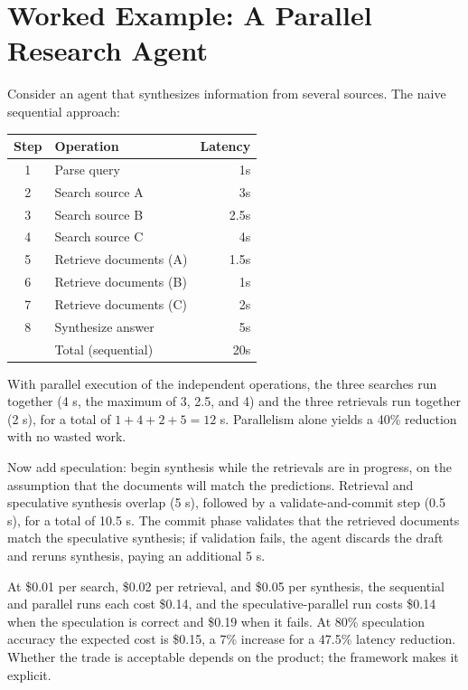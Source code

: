 \documentclass[11pt]{book}
\begin{document}
\section{Worked Example: A Parallel Research Agent}

Consider an agent that synthesizes information from several sources. The naive sequential approach:

\begin{center}
\begin{tabular}{clr}
\toprule
Step & Operation & Latency \\
\midrule
1 & Parse query & 1s \\
2 & Search source A & 3s \\
3 & Search source B & 2.5s \\
4 & Search source C & 4s \\
5 & Retrieve documents (A) & 1.5s \\
6 & Retrieve documents (B) & 1s \\
7 & Retrieve documents (C) & 2s \\
8 & Synthesize answer & 5s \\
\midrule
& Total (sequential) & 20s \\
\bottomrule
\end{tabular}
\end{center}

With parallel execution of the independent operations, the three searches run together (4 s, the maximum of 3, 2.5, and 4) and the three retrievals run together (2 s), for a total of $1 + 4 + 2 + 5 = 12$ s. Parallelism alone yields a 40\% reduction with no wasted work.

Now add speculation: begin synthesis while the retrievals are in progress, on the assumption that the documents will match the predictions. Retrieval and speculative synthesis overlap (5 s), followed by a validate-and-commit step (0.5 s), for a total of 10.5 s. The commit phase validates that the retrieved documents match the speculative synthesis; if validation fails, the agent discards the draft and reruns synthesis, paying an additional 5 s.

At \$0.01 per search, \$0.02 per retrieval, and \$0.05 per synthesis, the sequential and parallel runs each cost \$0.14, and the speculative-parallel run costs \$0.14 when the speculation is correct and \$0.19 when it fails. At 80\% speculation accuracy the expected cost is \$0.15, a 7\% increase for a 47.5\% latency reduction. Whether the trade is acceptable depends on the product; the framework makes it explicit.
\end{document}
